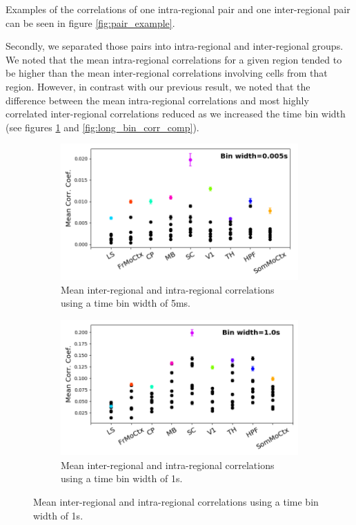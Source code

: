   Examples of the correlations of one intra-regional pair and one inter-regional pair can be seen in figure \ref{fig:pair_example}.

  Secondly, we separated those pairs into intra-regional and inter-regional groups. We noted that the mean intra-regional correlations for a given region tended to be higher than the mean inter-regional correlations involving cells from that region. However, in contrast with our previous result, we noted that the difference between the mean intra-regional correlations and most highly correlated inter-regional correlations reduced as we increased the time bin width (see figures \ref{fig:short_bin_corr_comp} and \ref{fig:long_bin_corr_comp}).

  \newpage

  \begin{figure}[h]
    \begin{subfigure}[h]{\linewidth}
      \centering
      \includegraphics[width=0.7\linewidth]{figures/eight_probe/Krebs_0p005_corr_comp.png}
      \caption{Mean inter-regional and intra-regional correlations using a time bin width of 5ms.}
      \label{fig:short_bin_corr_comp}
    \end{subfigure}
    \begin{subfigure}[h]{\linewidth}
      \centering
      \includegraphics[width=0.7\linewidth]{figures/eight_probe/Krebs_1p0_corr_comp.png}
      \caption{Mean inter-regional and intra-regional correlations using a time bin width of 1s.}

\end{subfigure}
\end{figure}
